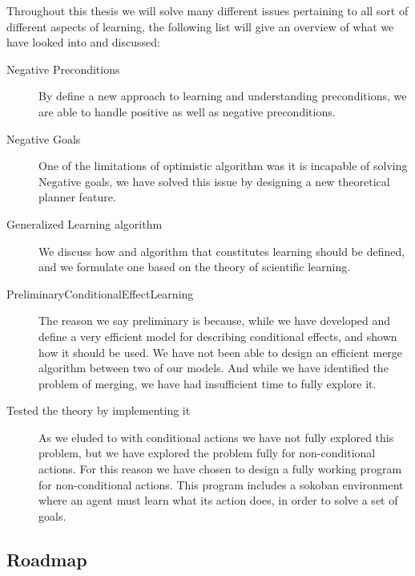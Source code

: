 \documentclass[Master.tex]{subfiles}
\begin{document}
	Throughout this thesis we will solve many different issues pertaining to all sort of different aspects of learning,
	the following list will give an overview of what we have looked into and discussed:
	\begin{description}
		\item[Negative\; Preconditions] 
		By define a new approach to learning and understanding preconditions, we are able to handle positive as well as negative preconditions.
		
		\item[Negative\; Goals] 
		One of the limitations of \cite{Walsh2008} optimistic algorithm was it is incapable of solving Negative goals, we have solved this issue by designing a new theoretical planner feature.
		
		\item[Generalized\; Learning\; algorithm] 
		We discuss how and algorithm that constitutes learning should be defined, and we formulate one based on the theory of scientific learning.
		
		\item[Preliminary\;Conditional\;Effect\;Learning]
		The reason we say preliminary is because, while we have developed and define a very efficient model for describing conditional effects, and shown how it should be used. We have not been able to design an efficient merge algorithm between two of our models. And while we have identified the problem of merging, we have had insufficient time to fully explore it.
		
		\item[Tested \; the \; theory \; by \; implementing \; it]
		As we eluded to with conditional actions we have not fully explored this problem, but we have explored the problem fully for non-conditional actions. For this reason we have chosen to design a fully working program for non-conditional actions. 
		This program includes a sokoban environment  where an agent must learn what its action does, in order to solve a set of goals.
		
	\end{description}
	
 \subsection*{Roadmap}
 
\end{document}
